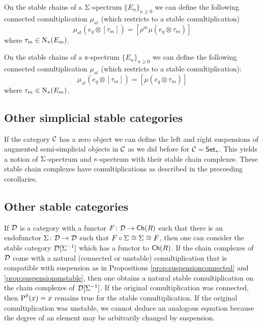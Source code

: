 \begin{corollary}
    On the stable chains of a $\Sigma^{}$-spectrum $\{E_n\}_{n\geq 0}$ we can define the following connected comultiplication $\mu_{st}$ (which restricts to a stable comultiplication)
    \[
        \mu_{st}(e_q\otimes [\tau_m]) = [\rho^m \mu(e_q\otimes \tau_m)]
    \]
    where $\tau_m\in \operatorname{N}_*(E_m)$.
\end{corollary}

\begin{corollary}
    On the stable chains of a $\operatorname{s}^{}$-spectrum $\{E_n\}_{n\geq 0}$ we can define the following connected comultiplication $\mu_{st}$ (which restricts to a stable comultiplication):
    \[
        \mu_{st}(e_q\otimes [\tau_m]) = [\mu(e_q\otimes \tau_m)]
    \]
    where $\tau_m\in\operatorname{N}_*(E_m)$.
\end{corollary}

\subsection{Other simplicial stable categories}

If the category $\mathcal{C}$ has a zero object we can define the left and right suspensions of augmented semi-simplicial objects in $\mathcal{C}$ as we did before for $\mathcal{C} = \mathsf{Set}_*$. This yields a notion of $\Sigma^{}$-spectrum and $\operatorname{s}^{}$-spectrum with their stable chain complexes. These stable chain complexes have comultiplications as described in the preceeding corollaries.

\subsection{Other stable categories}

If $\mathcal{D}$ is a category with a functor $F\colon \mathcal{D}\to \mathsf{Ch}(R)$ such that there is an endofunctor $\Sigma^{}\colon \mathcal{D}\to \mathcal{D}$ such that $F\circ \Sigma^{} \cong \Sigma^{}\cong F$, then one can consider the stable category $\mathcal{D}[\Sigma^{-1}]$ which has a functor to $\mathsf{Ch}(R)$. If the chain complexes of $\mathcal{D}$ come with a natural (connected or unstable) comultiplication that is compatible with suspension as in Propositions \ref{prop:suspensionconnected} and \ref{prop:suspensionunstable}, then one obtains a natural stable comultiplication on the chain complexes of $\mathcal{D}[\Sigma^{-1}]$. If the original comultiplication was connected, then $\operatorname{P}^0(x) = x$ remains true for the stable comultiplication. If the original comultiplication was unstable, we cannot deduce an analogous equation because the degree of an element may be arbitrarily changed by suspension.